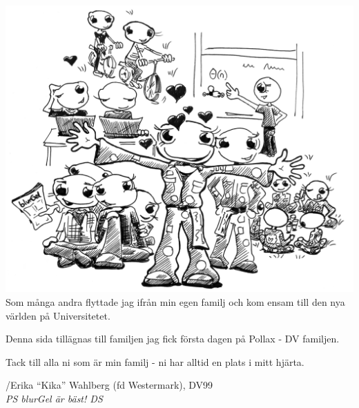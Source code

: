 \documentclass[a6paper,fontsize=10pt,twoside,open=right]{scrbook}
\begin{document}
\vspace{15pt}

\vspace{15pt}

\newpage

\newpage

\newpage
\null
\vspace{5pt}
\includegraphics[keepaspectratio,width=\textwidth]{elements/kika.jpg}
\vspace{10pt}\\ Som många andra flyttade jag ifrån min egen familj och
kom ensam till den nya världen på Universitetet.\par
\vspace{10pt}
Denna sida tillägnas till familjen jag fick första dagen på Pollax -
DV familjen.\par
\vspace{10pt}
Tack till alla ni som är min familj - ni har alltid en plats i mitt
hjärta.\par
\vspace{10pt}
/Erika ``Kika'' Wahlberg (fd Westermark),
DV99\\{\footnotesize\textit{PS blurGel är bäst! DS}}
\newpage

\vspace{15pt}

\newpage

\newpage

\newpage

\vspace{15pt}

\newpage

\vspace{15pt}
\end{document}
